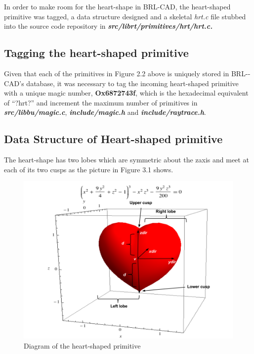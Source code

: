 In   order   to   make   room   for   the   heart­-shape   in   BRL-­CAD, the   heart-shaped  
primitive was tagged, a data   structure designed and  a skeletal   \textit{hrt.c}   file stubbed  into  
the source code repository in \textbf{\textit{src/librt/primitives/hrt/hrt.c.}}

\subsection{Tagging the heart­-shaped primitive}

Given   that   each   of   the   primitives   in   Figure   2.2   above   is   uniquely   stored   in  
BRL-­CAD's   database,   it   was   necessary   to   tag   the   incoming   heart-­shaped  
primitive   with   a   unique   magic   number,   \textbf{Ox6872743f},   which   is   the   hexadecimal  
equivalent   of   “?hrt?”   and   increment   the   maximum   number   of   primitives   in  
\textbf{\textit{src/libbu/magic.c}}, \textbf{\textit{include/magic.h}} and \textbf{\textit{include/raytrace.h}}.  

\subsection{Data Structure of Heart-shaped primitive }

\hspace{30} The   heart-­shape   has   two   lobes   which   are   symmetric   about   the   z­axis   and  
meet at each of its two cusps as the picture in Figure 3.1 shows.  

\begin{figure}[htbp]
\centering
\includegraphics[trim=0.0cm 0.5cm 0.1cm 0.1cm, clip=true, totalheight=0.4\textheight]{Pictures/Heart.png}
\caption[Diagram of the heart-shaped primitive]{Diagram of the heart-shaped primitive}
\label{Heart}
\end{figure}

